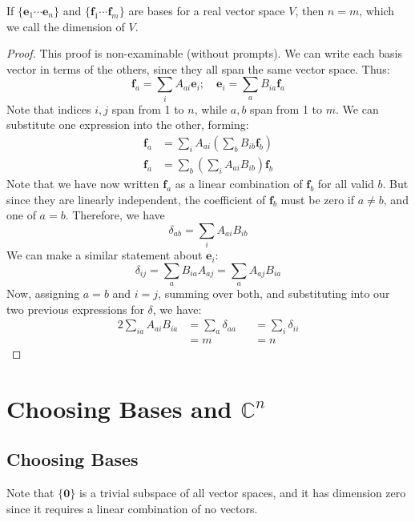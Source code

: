 \documentclass{article}
\begin{document}
\begin{theorem}
	If $\{\bm e_1 \cdots \bm e_n \}$ and $\{ \bm f_1 \cdots \bm f_m \}$ are bases for a real vector space $V$, then $n=m$, which we call the dimension of $V$.
\end{theorem}
\begin{proof}
	This proof is non-examinable (without prompts). We can write each basis vector in terms of the others, since they all span the same vector space. Thus:
	\[ \bm f_a = \sum_i A_{ai} \bm e_i;\quad \bm e_i = \sum_a B_{ia} \bm f_a \]
	Note that indices $i,j$ span from 1 to $n$, while $a,b$ span from 1 to $m$. We can substitute one expression into the other, forming:
	\begin{align*}
		\bm f_a & = \sum_i A_{ai} \left( \sum_b B_{ib}\bm f_b \right)  \\
		\bm f_a & = \sum_b \left( \sum_i A_{ai} B_{ib} \right) \bm f_b
	\end{align*}
	Note that we have now written $\bm f_a$ as a linear combination of $\bm f_b$ for all valid $b$. But since they are linearly independent, the coefficient of $\bm f_b$ must be zero if $a \neq b$, and one of $a = b$. Therefore, we have
	\[ \delta_{ab} = \sum_i A_{ai} B_{ib} \]
	We can make a similar statement about $\bm e_i$:
	\[ \delta_{ij} = \sum_a B_{ia} A_{aj} = \sum_a A_{aj} B_{ia} \]
	Now, assigning $a=b$ and $i=j$, summing over both, and substituting into our two previous expressions for $\delta$, we have:
	\begin{alignat}{2}
		\sum_{ia} A_{ai} B_{ia} & = \sum_a \delta_{aa} &  & = \sum_i \delta_{ii} \\
		                        & = m                  &  & = n
	\end{alignat}
\end{proof}

\section{Choosing Bases and $\mathbb C^n$}
\subsection{Choosing Bases}
Note that $\{ \bm 0 \}$ is a trivial subspace of all vector spaces, and it has dimension zero since it requires a linear combination of no vectors.
\end{document}
